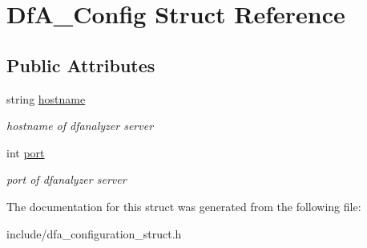 \hypertarget{structDfA__Config}{}\section{Df\+A\+\_\+\+Config Struct Reference}
\label{structDfA__Config}
\subsection*{Public Attributes}
\begin{DoxyCompactItemize}
\item 
\mbox{\label{structDfA__Config_a8b2084e26f2d851c1dc7830cfb833cae}} 
string \hyperlink{structDfA__Config_a8b2084e26f2d851c1dc7830cfb833cae}{hostname}
\begin{DoxyCompactList}\small\item\em hostname of dfanalyzer server \end{DoxyCompactList}\item 
\mbox{\label{structDfA__Config_a9da44f82fe807f72b43f96f548f24b1c}} 
int \hyperlink{structDfA__Config_a9da44f82fe807f72b43f96f548f24b1c}{port}
\begin{DoxyCompactList}\small\item\em port of dfanalyzer server \end{DoxyCompactList}\end{DoxyCompactItemize}


The documentation for this struct was generated from the following file\+:\begin{DoxyCompactItemize}
\item 
include/dfa\+\_\+configuration\+\_\+struct.\+h\end{DoxyCompactItemize}

